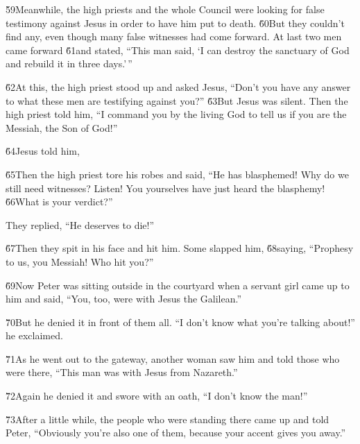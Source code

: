 \v{59}Meanwhile, the high priests and the whole Council were looking for false testimony against Jesus in order to have him put to death. \v{60}But they couldn't find any, even though many false witnesses had come forward. At last two men came forward \v{61}and stated, ``This man said, `I can destroy the sanctuary of God and rebuild it in three days.'\,''

\v{62}At this, the high priest stood up and asked Jesus, ``Don't you have any answer to what these men are testifying against you?'' \v{63}But Jesus was silent. Then the high priest told him, ``I command you by the living God to tell us if you are the Messiah, the Son of God!''

\v{64}Jesus told him, 

\v{65}Then the high priest tore his robes and said, ``He has blasphemed! Why do we still need witnesses? Listen! You yourselves have just heard the blasphemy! \v{66}What is your verdict?''

They replied, ``He deserves to die!''

\v{67}Then they spit in his face and hit him. Some slapped him, \v{68}saying, ``Prophesy to us, you Messiah! Who hit you?''

\v{69}Now Peter was sitting outside in the courtyard when a servant girl came up to him and said, ``You, too, were with Jesus the Galilean.''

\v{70}But he denied it in front of them all. ``I don't know what you're talking about!'' he exclaimed.

\v{71}As he went out to the gateway, another woman saw him and told those who were there, ``This man was with Jesus from Nazareth.''

\v{72}Again he denied it and swore with an oath, ``I don't know the man!''

\v{73}After a little while, the people who were standing there came up and told Peter, ``Obviously you're also one of them, because your accent gives you away.''

